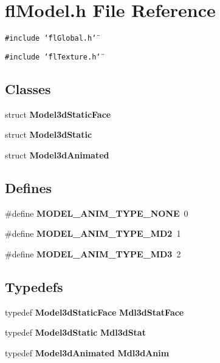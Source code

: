 \section{fl\-Model.h File Reference}
\label{flModel_8h}
{\tt \#include \char`\"{}fl\-Global.h\char`\"{}}\par
{\tt \#include \char`\"{}fl\-Texture.h\char`\"{}}\par
\subsection*{Classes}
\begin{CompactItemize}
\item 
struct {\bf Model3d\-Static\-Face}
\item 
struct {\bf Model3d\-Static}
\item 
struct {\bf Model3d\-Animated}
\end{CompactItemize}
\subsection*{Defines}
\begin{CompactItemize}
\item 
\#define {\bf MODEL\_\-ANIM\_\-TYPE\_\-NONE}~0
\item 
\#define {\bf MODEL\_\-ANIM\_\-TYPE\_\-MD2}~1
\item 
\#define {\bf MODEL\_\-ANIM\_\-TYPE\_\-MD3}~2
\end{CompactItemize}
\subsection*{Typedefs}
\begin{CompactItemize}
\item 
typedef {\bf Model3d\-Static\-Face} {\bf Mdl3d\-Stat\-Face}
\item 
typedef {\bf Model3d\-Static} {\bf Mdl3d\-Stat}
\item 
typedef {\bf Model3d\-Animated} {\bf Mdl3d\-Anim}
\end{CompactItemize}
